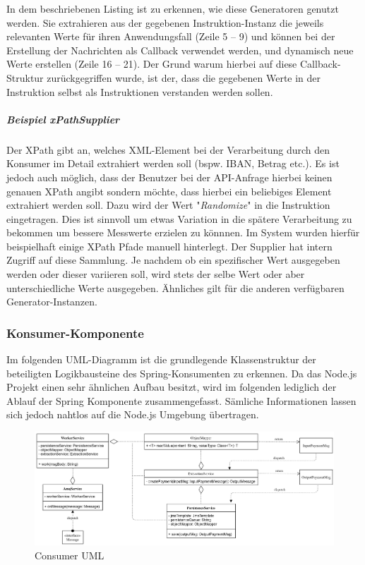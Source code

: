 In dem beschriebenen Listing ist zu erkennen, wie diese Generatoren genutzt werden. Sie extrahieren aus der gegebenen Instruktion-Instanz die jeweils relevanten Werte für ihren Anwendungsfall (Zeile 5 -- 9) und können bei der Erstellung der Nachrichten als Callback verwendet werden, und dynamisch neue Werte erstellen (Zeile 16 -- 21). Der Grund warum hierbei auf diese Callback-Struktur zurückgegriffen wurde, ist der, dass die gegebenen Werte in der Instruktion selbst als Instruktionen verstanden werden sollen. 

\subparagraph{Beispiel xPathSupplier} 
Der XPath gibt an, welches XML-Element bei der Verarbeitung durch den Konsumer im Detail extrahiert werden soll (bspw. IBAN, Betrag etc.). Es ist jedoch auch möglich, dass der Benutzer bei der API-Anfrage hierbei keinen genauen XPath angibt sondern möchte, dass hierbei ein beliebiges Element extrahiert werden soll. Dazu wird der Wert "\emph{Randomize}" in die Instruktion eingetragen. Dies ist sinnvoll um etwas Variation in die spätere Verarbeitung zu bekommen um bessere Messwerte erzielen zu könnnen. Im System wurden hierfür beispielhaft einige XPath Pfade manuell hinterlegt. Der Supplier hat intern Zugriff auf diese Sammlung. Je nachdem ob ein spezifischer Wert ausgegeben werden oder dieser variieren soll, wird stets der selbe Wert oder aber unterschiedliche Werte ausgegeben. Ähnliches gilt für die anderen verfügbaren Generator-Instanzen.


\subsubsection{Konsumer-Komponente}

Im folgenden UML-Diagramm ist die grundlegende Klassenstruktur der beteiligten Logikbausteine des Spring-Konsumenten zu erkennen. Da das Node.js Projekt einen sehr ähnlichen Aufbau besitzt, wird im folgenden lediglich der Ablauf der Spring Komponente zusammengefasst. Sämliche Informationen lassen sich jedoch nahtlos auf die Node.js Umgebung übertragen. 

\begin{figure}[ht!]
	\centering
	\includegraphics[width=\linewidth]{kapitel/problemloesung/implementierung/_img/consumer-uml}
	\caption[Consumer UML]{Consumer UML}
	\label{fig:consumerUml}
\end{figure}

